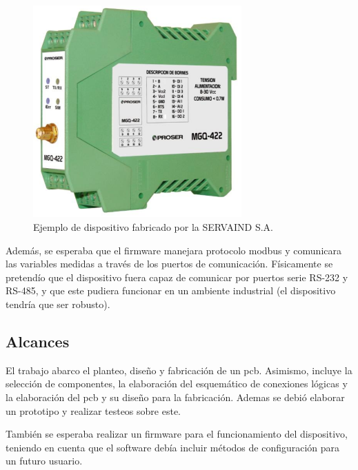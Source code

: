 \begin{figure}[!h]
	\centering
	\includegraphics[width=80mm,keepaspectratio]{Figures/dispositivo_empresa.png}
	\caption{Ejemplo de dispositivo fabricado por la SERVAIND S.A.}
	\label{fig:disp_emp}
\end{figure}

Además, se esperaba que el firmware manejara protocolo modbus y comunicara las variables medidas a través de los puertos de comunicación. Físicamente se pretendío que el dispositivo fuera capaz de comunicar por puertos serie RS-232 y RS-485, y que este pudiera funcionar en un ambiente industrial (el dispositivo tendría que ser robusto).


\subsection{Alcances}



El trabajo abarco el planteo, diseño y fabricación de un pcb. Asimismo, incluye la selección de componentes, la elaboración del esquemático de conexiones lógicas y la elaboración del pcb y su diseño para la fabricación. Ademas se debió elaborar un prototipo y realizar testeos sobre este.

También se esperaba realizar un firmware para el funcionamiento del dispositivo, teniendo en cuenta que el software debía incluir métodos de configuración para un futuro usuario.






